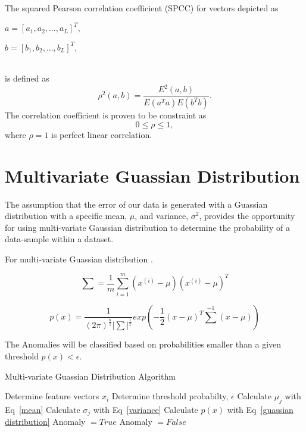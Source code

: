 The squared Pearson correlation coefficient (SPCC) for vectors depicted as
\linebreak
\\
\centerline{$a = [a_1, a_2, \ldots, a_L]^T,$}
\linebreak
\centerline{$b = [b_1, b_2, \ldots, b_L]^T,$}
\\
is defined as \cite{benesty2009pearson}
\begin{equation}
	\rho^2 (a,b) = \frac{E^2 (a,b)}{E(a^Ta)E(b^Tb)}.
\end{equation}
The correlation coefficient is proven to be constraint as
\begin{equation}
	0 \leq \rho \leq 1,
\end{equation}
where $\rho = 1$ is perfect linear correlation. 

\section{Multivariate Guassian Distribution}
The assumption that the error of our data is generated with a Guassian distribution with a specific mean, $\mu$, and variance, $\sigma^2$, provides the opportunity for using multi-variate Gaussian distribution to determine the probability of a data-sample within a dataset. 

For multi-variate Guassian distribution \cite{do2008multivariate}.

\begin{equation}
	\label{sum}
	\sum = \frac{1}{m}\sum_{i=1}^{m}(x^{(i)}-\mu)(x^{(i)}-\mu)^T
\end{equation}

\begin{equation}
	\label{multi-variate guassian distribution}
	p(x) = \frac{1}{(2\pi)^{\frac{n}{2}}{\lvert \sum \rvert}^\frac{1}{2}} exp(-\frac{1}{2}(x-\mu)^T{\sum}^{-1}(x-\mu))
\end{equation}

The Anomalies will be classified based on probabilities smaller than a given threshold $p(x) < \epsilon$.

\begin{algorithm}[!htb]
	\caption[Multi-variate Guassian Distribution]{Multi-variate Guassian Distribution Algorithm}
	\label{alg}
	\begin{algorithmic}[1]
		\State Determine feature vectors $x_i$
		\State Determine threshold probabilty, $\epsilon$
		\State Calculate $\mu_j$ with Eq~\ref{mean}
		\State Calculate $\sigma_j$ with Eq~\ref{variance}
		\State Calculate $p(x)$ with Eq~\ref{guassian distribution}
			\State Anomaly $= True$
		\Else
			\State Anomaly $= False$
		\EndIf
		
	\end{algorithmic}
\end{algorithm}

